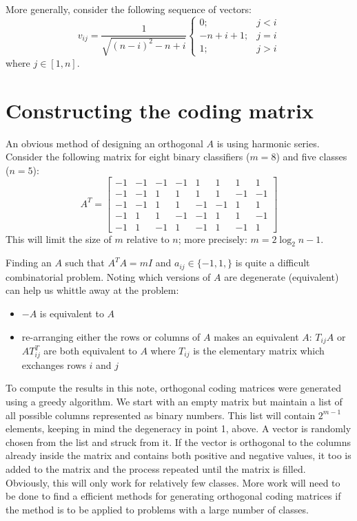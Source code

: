More generally, consider the following sequence of vectors:
\begin{equation}
	v_{ij} = \frac{1}{\sqrt{(n-i)^2-n+i}} \left \lbrace \begin{array}{rl}
			0; & j < i \\
			-n+i+1; & j=i \\
			1; & j > i
		\end{array} \right .
\end{equation}
where $j \in [1, n]$.


\section{Constructing the coding matrix}

An obvious method of designing an orthogonal $A$ is using harmonic series.
Consider the following matrix for eight binary classifiers ($m=8$) and
five classes ($n=5$):
\begin{equation}
	A^T = \left [ \begin{array}{rrrrrrrr}
			-1 & -1 & -1 & -1 & 1 & 1 & 1 & 1 \\
			-1 & -1 & 1 & 1 & 1 & 1 & -1 & -1 \\
			-1 & -1 & 1 & 1 & -1 & -1 & 1 & 1 \\
			-1 & 1 & 1 & -1 & -1 & 1 & 1 & -1 \\
			-1 & 1 & -1 & 1 & -1 & 1 & -1 & 1
	\end{array} \right ]
\end{equation}
This will limit the size of $m$ relative to $n$; more precisely:
$m=2 \log_2 n - 1$.

Finding an $A$ such that $A^T A = m I$ and $a_{ij} \in \lbrace -1, 1, \rbrace$
is quite a difficult combinatorial problem.
Noting which versions of $A$ are degenerate (equivalent) can help us whittle
away at the problem:
\begin{itemize}
	\item $-A$ is equivalent to $A$
	\item re-arranging either the rows or columns of $A$ makes an equivalent $A$: $T_{ij} A$ or $A T_{ij}^T$ are both equivalent to $A$ where $T_{ij}$ is the elementary matrix which exchanges rows $i$ and $j$
\end{itemize}

To compute the results in this note, orthogonal coding matrices were generated
using a greedy algorithm.
We start with an empty matrix but
maintain a list of all possible columns represented as binary numbers.
This list will contain $2^{m-1}$ elements, keeping in mind the degeneracy in
point 1, above.
A vector is randomly chosen from the list and struck from it.
If the vector is orthogonal to the columns already inside the matrix
and contains both positive and  negative values, it too is added to the matrix
and the process repeated until the matrix is filled.
Obviously, this will only work for relatively few classes.
More work will need to be done to find a efficient methods for generating 
orthogonal coding matrices
if the method is to be applied to problems with a large number of classes.

